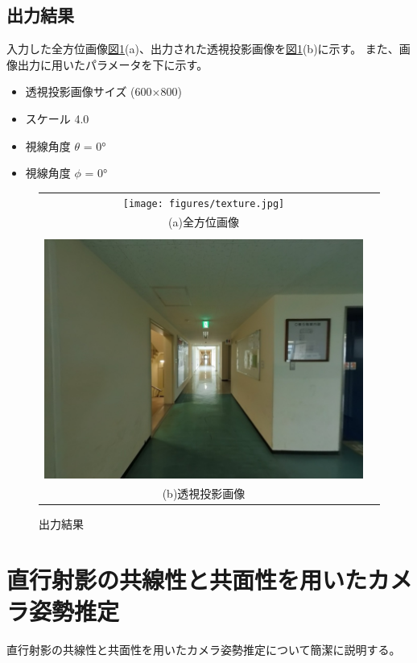 \documentclass[]{jarticle}          %
\begin{document}
\subsection{出力結果}
入力した全方位画像\hyperref[one]{図\ref{one}}(a)、出力された透視投影画像を\hyperref[one]{図\ref{one}}(b)に示す。
また、画像出力に用いたパラメータを下に示す。
\begin{itemize}
  \item 透視投影画像サイズ (600$\times$800)
  \item スケール 4.0
  \item 視線角度 $\theta$ = 0°
  \item 視線角度 $\phi$ = 0°
\end{itemize}
\begin{figure}[!ht]
  \begin{center}
    \begin{tabular}{cc}
      \texttt{[image: figures/texture.jpg]}\\
      (a)全方位画像\\
      \\
      \includegraphics[keepaspectratio, scale=0.4]{figures/output_image.jpg}\\
      (b)透視投影画像\\
    \end{tabular}
  \end{center}
  \caption{出力結果}
  \label{one}
\end{figure}

\section{直行射影の共線性と共面性を用いたカメラ姿勢推定}
直行射影の共線性と共面性を用いたカメラ姿勢推定について簡潔に説明する。
\end{document}
